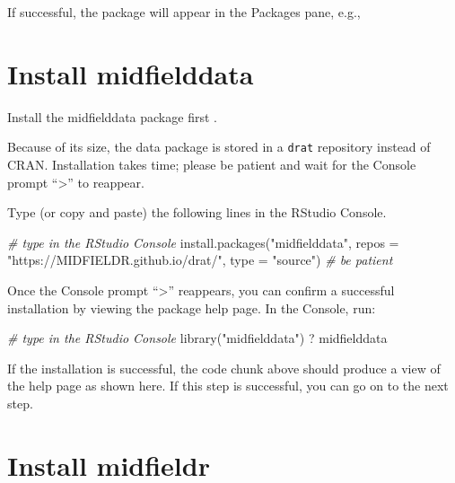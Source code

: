 \documentclass[
]{book}
\newenvironment{Shaded}{\begin{snugshade}}{\end{snugshade}}
\newcommand{\AttributeTok}[1]{\textcolor[rgb]{0.77,0.63,0.00}{#1}}
\newcommand{\CommentTok}[1]{\textcolor[rgb]{0.56,0.35,0.01}{\textit{#1}}}
\newcommand{\FunctionTok}[1]{\textcolor[rgb]{0.00,0.00,0.00}{#1}}
\newcommand{\NormalTok}[1]{#1}
\newcommand{\StringTok}[1]{\textcolor[rgb]{0.31,0.60,0.02}{#1}}
\begin{document}
If successful, the package will appear in the Packages pane, e.g.,

\hypertarget{install-midfielddata}{%
\section*{Install midfielddata}\label{install-midfielddata}}

Install the midfielddata package first \citep{R-midfielddata}.

Because of its size, the data package is stored in a \texttt{drat} repository instead of CRAN. Installation takes time; please be patient and wait for the Console prompt ``\textgreater{}'' to reappear.

Type (or copy and paste) the following lines in the RStudio Console.

\begin{Shaded}
\begin{Highlighting}[]
\CommentTok{\# type in the RStudio Console  }
\FunctionTok{install.packages}\NormalTok{(}\StringTok{"midfielddata"}\NormalTok{, }
                 \AttributeTok{repos =} \StringTok{"https://MIDFIELDR.github.io/drat/"}\NormalTok{, }
                 \AttributeTok{type =} \StringTok{"source"}\NormalTok{)}
\CommentTok{\# be patient}
\end{Highlighting}
\end{Shaded}

Once the Console prompt ``\textgreater{}'' reappears, you can confirm a successful installation by viewing the package help page. In the Console, run:

\begin{Shaded}
\begin{Highlighting}[]
\CommentTok{\# type in the RStudio Console  }
\FunctionTok{library}\NormalTok{(}\StringTok{"midfielddata"}\NormalTok{)}
\NormalTok{? midfielddata}
\end{Highlighting}
\end{Shaded}

If the installation is successful, the code chunk above should produce a view of the help page as shown here. If this step is successful, you can go on to the next step.

\hypertarget{install-midfieldr}{%
\section*{Install midfieldr}\label{install-midfieldr}}
\end{document}
